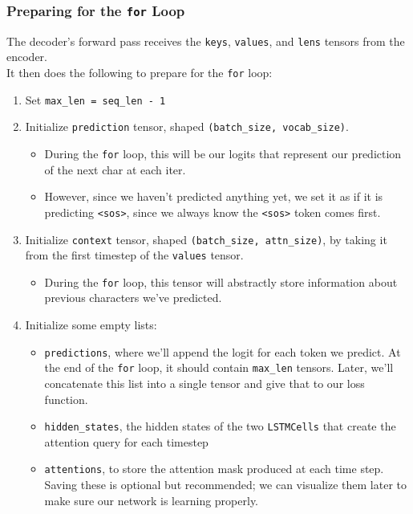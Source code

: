 \documentclass{article}
\newcommand{\ttt}[1]{\texttt{#1}}
\begin{document}
\subsubsection{Preparing for the \ttt{for} Loop}

The decoder's forward pass receives the \ttt{keys}, \ttt{values}, and \ttt{lens} tensors from the encoder. \\

It then does the following to prepare for the \ttt{for} loop:

\begin{enumerate}
    \item Set \ttt{max\_len = seq\_len - 1}
    \item Initialize \ttt{prediction} tensor, shaped \ttt{(batch\_size, vocab\_size)}.
        \begin{itemize}
            \item During the \ttt{for} loop, this will be our logits that represent our prediction of the next char at each iter.
            \item However, since we haven't predicted anything yet, we set it as if it is predicting \ttt{<sos>}, since we always know the \ttt{<sos>} token comes first.
        \end{itemize}
    \item Initialize \ttt{context} tensor, shaped \ttt{(batch\_size, attn\_size)}, by taking it from the first timestep of the \ttt{values} tensor.
        \begin{itemize}
            \item During the \ttt{for} loop, this tensor will abstractly store information about previous characters we've predicted.
        \end{itemize}
    \item Initialize some empty lists:
        \begin{itemize}
            \item \ttt{predictions}, where we'll append the logit for each token we predict. At the end of the \ttt{for} loop, it should contain \ttt{max\_len} tensors. Later, we'll concatenate this list into a single tensor and give that to our loss function.
            \item \ttt{hidden\_states}, the hidden states of the two \ttt{LSTMCells} that create the attention query for each timestep 
            \item \ttt{attentions}, to store the attention mask produced at each time step. Saving these is optional but recommended; we can visualize them later to make sure our network is learning properly.
        \end{itemize}
\end{enumerate}
\end{document}
